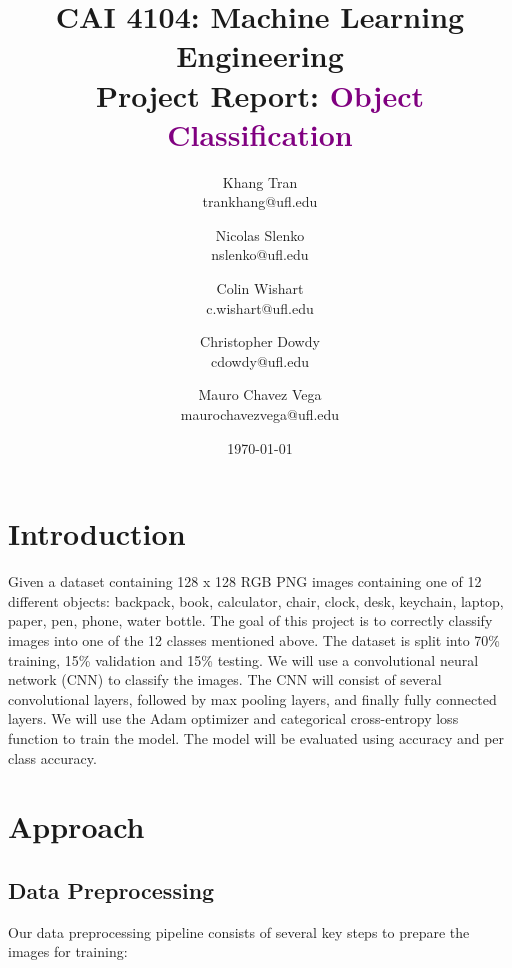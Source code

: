 \documentclass[10pt]{article}
\title{CAI 4104: Machine Learning Engineering\\
	\large Project Report:  {\textcolor{purple}{Object Classification}}} %
\author{
        Khang Tran \\
        trankhang@ufl.edu\\
        \and
        Nicolas Slenko \\
        nslenko@ufl.edu\\
        \and
        Colin Wishart \\
        c.wishart@ufl.edu\\
        \and
        Christopher Dowdy \\
        cdowdy@ufl.edu\\
        \and
        Mauro Chavez Vega \\
        maurochavezvega@ufl.edu\\
}
\date{\today}
\begin{document}

\maketitle






\section{Introduction}

Given a dataset containing 128 x 128 RGB PNG images containing one of 12 different objects: backpack, book, calculator, chair, clock, desk, keychain, laptop, paper, pen, phone, water bottle. The
goal of this project is to correctly classify images into one of the 12 classes mentioned above. The dataset is split into 70\% training, 15\% validation and 15\% testing. We will use a 
convolutional neural network (CNN) to classify the images. The CNN will consist of several convolutional layers, followed by max pooling layers, and finally fully connected layers. 
We will use the Adam optimizer and categorical cross-entropy loss function to train the model. The model will be evaluated using accuracy and per class accuracy.





\section{Approach}

\subsection{Data Preprocessing}

Our data preprocessing pipeline consists of several key steps to prepare the images for training:
\end{document}
